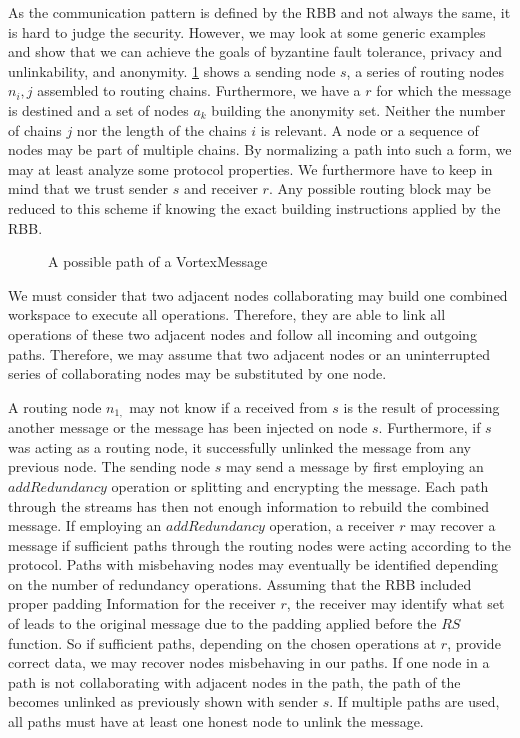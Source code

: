As the communication pattern is defined by the RBB and not always the same, it is hard to judge the security. However, we may look at some generic examples and show that we can achieve the goals of byzantine fault tolerance, privacy and unlinkability, and anonymity. \cref{fig:messagePaths} shows a sending node $s$, a series of routing nodes $n_i,j$ assembled to routing chains. Furthermore, we have a $r$ for which the message is destined and a set of nodes $a_k$ building the anonymity set. Neither the number of chains $j$ nor the length of the chains $i$ is relevant. A node or a sequence of nodes may be part of multiple chains. By normalizing a path into such a form, we may at least analyze some protocol properties. We furthermore have to keep in mind that we trust sender $s$ and receiver $r$. Any possible routing block may be reduced to this scheme if knowing the exact building instructions applied by the RBB.

\begin{figure}[ht]
	\centering\resizebox{.95\linewidth}{!}{
		
	}
	\caption{A possible path of a VortexMessage}
	\label{fig:messagePaths}
\end{figure}

We must consider that two adjacent nodes collaborating may build one combined workspace to execute all operations. Therefore, they are able to link all operations of these two adjacent nodes and follow all incoming and outgoing paths. Therefore, we may assume that two adjacent nodes or an uninterrupted series of collaborating nodes may be substituted by one node.

A routing node $n_{1,}$ may not know if a \VortexMessage{} received from $s$ is the result of processing another message or the message has been injected on node $s$. Furthermore, if $s$ was acting as a routing node, it successfully unlinked the message from any previous node. The sending node $s$ may send a message by first employing an $addRedundancy$ operation or splitting and encrypting the message. Each path through the streams has then not enough information to rebuild the combined message. If employing an $addRedundancy$ operation, a receiver $r$ may recover a message if sufficient paths through the routing nodes were acting according to the protocol. Paths with misbehaving nodes may eventually be identified depending on the number of redundancy operations. Assuming that the RBB included proper padding Information for the receiver $r$, the receiver may identify what set of \VortexMessages leads to the original message due to the padding applied before the $RS$ function. So if sufficient paths, depending on the chosen operations at $r$, provide correct data, we may recover nodes misbehaving in our paths. If one node in a path is not collaborating with adjacent nodes in the path, the path of the \VortexMessage becomes unlinked as previously shown with sender $s$. If multiple paths are used, all paths must have at least one honest node to unlink the message. 

